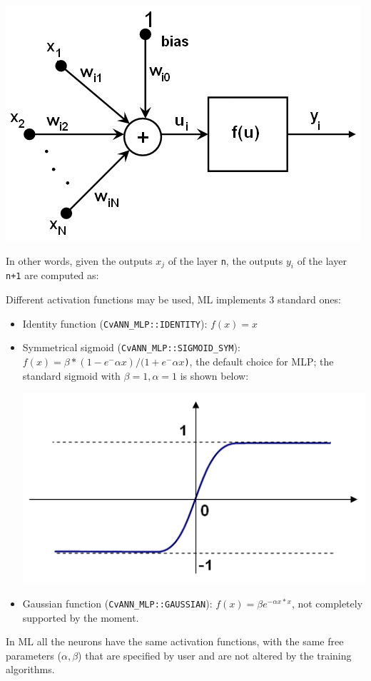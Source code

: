 \includegraphics{pics/neuron_model.png}

In other words, given the outputs \texttt{{$x_j$}} of the layer \texttt{n}, the outputs \texttt{{$y_i$}} of the layer \texttt{n+1} are computed as:


Different activation functions may be used, ML implements 3 standard ones:
\begin{itemize}
\item{Identity function (\texttt{CvANN\_MLP::IDENTITY}): \texttt{$f(x)=x$}}
\item{Symmetrical sigmoid (\texttt{CvANN\_MLP::SIGMOID\_SYM}): \texttt{$f(x)=\beta*(1-e^-\alpha x)/(1+e^-\alpha x$)}, the default choice for MLP; the standard sigmoid with $\beta =1, \alpha =1$ is shown below:}

\includegraphics{pics/sigmoid_bipolar.png} 

\item{Gaussian function (\texttt{CvANN\_MLP::GAUSSIAN}): \texttt{$f(x)=\beta e^{-\alpha x*x}$}, not completely supported by the moment.}
\end{itemize}
In ML all the neurons have the same activation functions, with the same free parameters ($\alpha, \beta$) that are specified by user and are not altered by the training algorithms.

